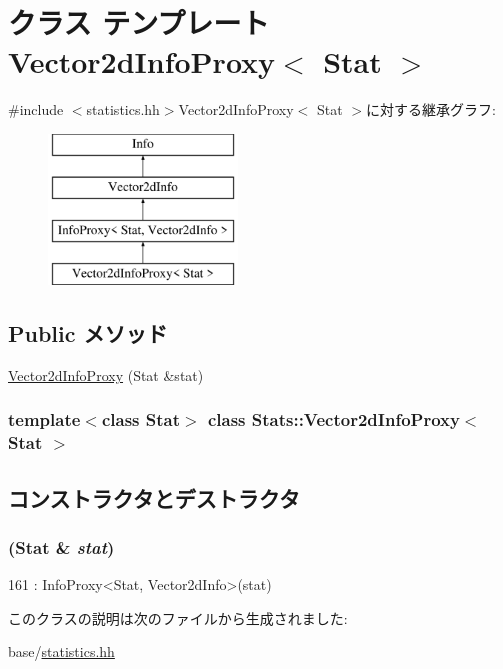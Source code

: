 \hypertarget{classStats_1_1Vector2dInfoProxy}{
\section{クラス テンプレート Vector2dInfoProxy$<$ Stat $>$}
\label{classStats_1_1Vector2dInfoProxy}
}


{\ttfamily \#include $<$statistics.hh$>$}Vector2dInfoProxy$<$ Stat $>$に対する継承グラフ:\begin{figure}[H]
\begin{center}
\leavevmode
\includegraphics[height=4cm]{classStats_1_1Vector2dInfoProxy}
\end{center}
\end{figure}
\subsection*{Public メソッド}
\begin{DoxyCompactItemize}
\item 
\hyperlink{classStats_1_1Vector2dInfoProxy_abdadaa584df3c0d5d418bf60d7bee546}{Vector2dInfoProxy} (Stat \&stat)
\end{DoxyCompactItemize}
\subsubsection*{template$<$class Stat$>$ class Stats::Vector2dInfoProxy$<$ Stat $>$}



\subsection{コンストラクタとデストラクタ}
\hypertarget{classStats_1_1Vector2dInfoProxy_abdadaa584df3c0d5d418bf60d7bee546}{
\subsubsection[{Vector2dInfoProxy}]{ (Stat \& {\em stat})}}
\label{classStats_1_1Vector2dInfoProxy_abdadaa584df3c0d5d418bf60d7bee546}



\begin{DoxyCode}
161 : InfoProxy<Stat, Vector2dInfo>(stat) {}
\end{DoxyCode}


このクラスの説明は次のファイルから生成されました:\begin{DoxyCompactItemize}
\item 
base/\hyperlink{statistics_8hh}{statistics.hh}\end{DoxyCompactItemize}
